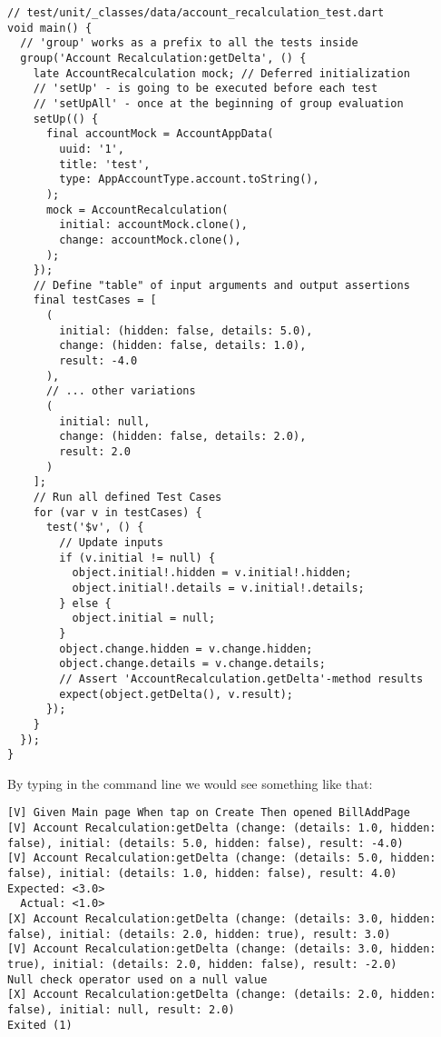 \begin{lstlisting}
// test/unit/_classes/data/account_recalculation_test.dart 
void main() {
  // 'group' works as a prefix to all the tests inside
  group('Account Recalculation:getDelta', () {
    late AccountRecalculation mock; // Deferred initialization 
    // 'setUp' - is going to be executed before each test
    // 'setUpAll' - once at the beginning of group evaluation
    setUp(() {
      final accountMock = AccountAppData(
        uuid: '1',
        title: 'test',
        type: AppAccountType.account.toString(),
      );
      mock = AccountRecalculation(
        initial: accountMock.clone(),
        change: accountMock.clone(),
      );
    });
    // Define "table" of input arguments and output assertions
    final testCases = [
      (
        initial: (hidden: false, details: 5.0),
        change: (hidden: false, details: 1.0),
        result: -4.0
      ),
      // ... other variations
      (
        initial: null,
        change: (hidden: false, details: 2.0),
        result: 2.0
      )
    ];
    // Run all defined Test Cases
    for (var v in testCases) {
      test('$v', () {
        // Update inputs
        if (v.initial != null) {
          object.initial!.hidden = v.initial!.hidden;
          object.initial!.details = v.initial!.details;
        } else {
          object.initial = null;
        }
        object.change.hidden = v.change.hidden;
        object.change.details = v.change.details;
        // Assert 'AccountRecalculation.getDelta'-method results
        expect(object.getDelta(), v.result);
      });
    }
  });
}
\end{lstlisting}

\noindent By typing  in the command line we would see something like that:

\begin{lstlisting}
[V] Given Main page When tap on Create Then opened BillAddPage
[V] Account Recalculation:getDelta (change: (details: 1.0, hidden: false), initial: (details: 5.0, hidden: false), result: -4.0)
[V] Account Recalculation:getDelta (change: (details: 5.0, hidden: false), initial: (details: 1.0, hidden: false), result: 4.0)
Expected: <3.0>
  Actual: <1.0>
[X] Account Recalculation:getDelta (change: (details: 3.0, hidden: false), initial: (details: 2.0, hidden: true), result: 3.0)
[V] Account Recalculation:getDelta (change: (details: 3.0, hidden: true), initial: (details: 2.0, hidden: false), result: -2.0)
Null check operator used on a null value
[X] Account Recalculation:getDelta (change: (details: 2.0, hidden: false), initial: null, result: 2.0)
Exited (1)
\end{lstlisting}

